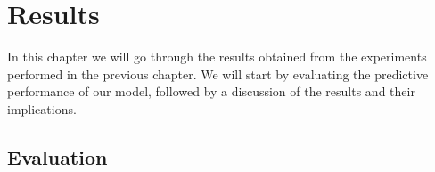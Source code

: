 
\chapter{Results}\label{chap:results}

In this chapter we will go through the results obtained from the experiments
performed in the previous chapter. We will start by evaluating the predictive
performance of our model, followed by a discussion of the results and their
implications.

\section{Evaluation}

